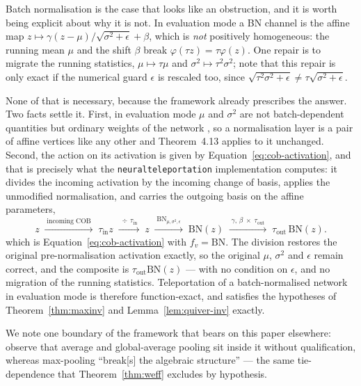 Batch normalisation is the case that looks like an obstruction, and it is worth
being explicit about why it is not. In evaluation
mode a BN channel is the affine
map $z\mapsto\gamma(z-\mu)/\sqrt{\sigma^2+\epsilon}+\beta$, which is
\emph{not} positively homogeneous: the running mean $\mu$ and the shift $\beta$
break $\varphi(\tau z)=\tau\varphi(z)$. One repair is to migrate the running
statistics, $\mu\mapsto\tau\mu$ and $\sigma^2\mapsto\tau^2\sigma^2$; note that
this repair is only exact if the numerical guard $\epsilon$ is rescaled too,
since $\sqrt{\tau^2\sigma^2+\epsilon}\neq\tau\sqrt{\sigma^2+\epsilon}$.

None of that is necessary, because the framework already prescribes the answer.
Two facts settle it. First, in evaluation mode $\mu$ and $\sigma^2$ are not
batch-dependent quantities but ordinary weights of the network
\citep[Remark~5.4]{armenta2021representation}, so a normalisation layer is a pair
of affine vertices like any other and Theorem~4.13 applies to it unchanged.
Second, the action on its activation is given by
Equation~\eqref{eq:cob-activation}, and that is precisely what the
\texttt{neuralteleportation} implementation computes: it divides the incoming
activation by the incoming change of basis, applies the unmodified
normalisation, and carries the outgoing basis on the affine parameters,
\[
z \;\xrightarrow{\;\text{incoming COB}\;}\; \tau_{\mathrm{in}} z
\;\xrightarrow{\;\div\,\tau_{\mathrm{in}}\;}\; z
\;\xrightarrow{\;\mathrm{BN}_{\mu,\sigma^2,\epsilon}\;}\; \mathrm{BN}(z)
\;\xrightarrow{\;\gamma,\,\beta\;\times\;\tau_{\mathrm{out}}\;}\;
\tau_{\mathrm{out}}\,\mathrm{BN}(z).
\]
which is Equation~\eqref{eq:cob-activation} with $f_v=\mathrm{BN}$. The division
restores the original pre-normalisation activation exactly, so the original
$\mu$, $\sigma^2$ and $\epsilon$ remain correct, and the composite is
$\tau_{\mathrm{out}}\mathrm{BN}(z)$ --- with no condition on $\epsilon$, and no
migration of the running statistics. Teleportation of a batch-normalised network
in evaluation mode is therefore function-exact, and satisfies the hypotheses of
Theorem~\ref{thm:maxinv} and Lemma~\ref{lem:quiver-inv} exactly.

We note one boundary of the framework that bears on this paper elsewhere:
\citet{armenta2021representation} observe that average and global-average pooling
sit inside it without qualification, whereas max-pooling ``break[s] the algebraic
structure'' --- the same tie-dependence that Theorem~\ref{thm:weff} excludes by
hypothesis.


